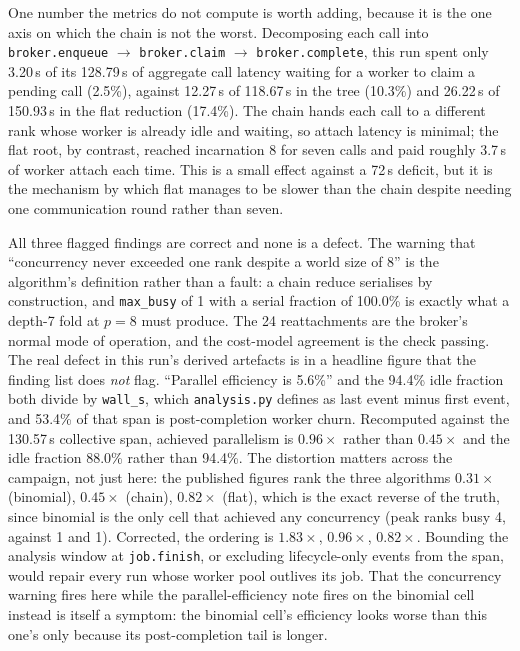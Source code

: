 \documentclass[11pt]{article}
\begin{document}
One number the metrics do not compute is worth adding, because it is the one axis on
which the chain is not the worst. Decomposing each call into \texttt{broker.enqueue}
$\to$ \texttt{broker.claim} $\to$ \texttt{broker.complete}, this run spent only 3.20\,s
of its 128.79\,s of aggregate call latency waiting for a worker to claim a pending call
(2.5\%), against 12.27\,s of 118.67\,s in the tree (10.3\%) and 26.22\,s of 150.93\,s in
the flat reduction (17.4\%). The chain hands each call to a different rank whose worker
is already idle and waiting, so attach latency is minimal; the flat root, by contrast,
reached incarnation 8 for seven calls and paid roughly 3.7\,s of worker attach each
time. This is a small effect against a 72\,s deficit, but it is the mechanism by which
flat manages to be slower than the chain despite needing one communication round rather
than seven.

All three flagged findings are correct and none is a defect. The warning that
``concurrency never exceeded one rank despite a world size of 8'' is the algorithm's
definition rather than a fault: a chain reduce serialises by construction, and
\texttt{max\_busy} of 1 with a serial fraction of 100.0\% is exactly what a depth-7 fold
at $p = 8$ must produce. The 24 reattachments are the broker's normal mode of operation,
and the cost-model agreement is the check passing. The real defect in this run's derived
artefacts is in a headline figure that the finding list does \emph{not} flag. ``Parallel
efficiency is 5.6\%'' and the 94.4\% idle fraction both divide by
\texttt{wall\_s}, which \texttt{analysis.py} defines as last event minus first event,
and 53.4\% of that span is post-completion worker churn. Recomputed against the
130.57\,s collective span, achieved parallelism is $0.96\times$ rather than
$0.45\times$ and the idle fraction 88.0\% rather than 94.4\%. The distortion matters
across the campaign, not just here: the published figures rank the three algorithms
$0.31\times$ (binomial), $0.45\times$ (chain), $0.82\times$ (flat), which is the exact
reverse of the truth, since binomial is the only cell that achieved any concurrency
(peak ranks busy 4, against 1 and 1). Corrected, the ordering is $1.83\times$,
$0.96\times$, $0.82\times$. Bounding the analysis window at \texttt{job.finish}, or
excluding lifecycle-only events from the span, would repair every run whose worker pool
outlives its job. That the concurrency warning fires here while the parallel-efficiency
note fires on the binomial cell instead is itself a symptom: the binomial cell's
efficiency looks worse than this one's only because its post-completion tail is longer.
\end{document}
